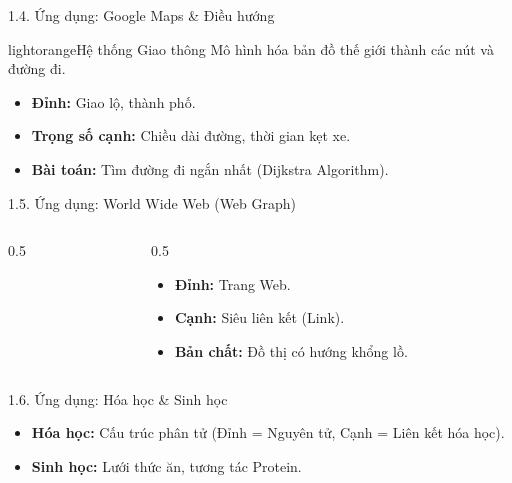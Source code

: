 \documentclass[10pt, xcolor={dvipsnames}]{beamer}
\begin{document}
\begin{frame}{1.4. Ứng dụng: Google Maps & Điều hướng}
    \begin{detailbox}{lightorange}{Hệ thống Giao thông}
        Mô hình hóa bản đồ thế giới thành các nút và đường đi.
    \end{detailbox}
    \begin{itemize}
        \item \textbf{Đỉnh:} Giao lộ, thành phố.
        \item \textbf{Trọng số cạnh:} Chiều dài đường, thời gian kẹt xe.
        \item \textbf{Bài toán:} Tìm đường đi ngắn nhất (Dijkstra Algorithm).
    \end{itemize}
\end{frame}

\begin{frame}{1.5. Ứng dụng: World Wide Web (Web Graph)}
    \begin{columns}
        \begin{column}{0.5\textwidth}
            \centering
        \end{column}
        \begin{column}{0.5\textwidth}
            \begin{itemize}
                \item \textbf{Đỉnh:} Trang Web.
                \item \textbf{Cạnh:} Siêu liên kết (Link).
                \item \textbf{Bản chất:} Đồ thị có hướng khổng lồ.
            \end{itemize}
        \end{column}
    \end{columns}
\end{frame}

\begin{frame}{1.6. Ứng dụng: Hóa học & Sinh học}
    \begin{itemize}
        \item \textbf{Hóa học:} Cấu trúc phân tử (Đỉnh = Nguyên tử, Cạnh = Liên kết hóa học).
        \item \textbf{Sinh học:} Lưới thức ăn, tương tác Protein.
    \end{itemize}
    \centering
\end{frame}
\end{document}
